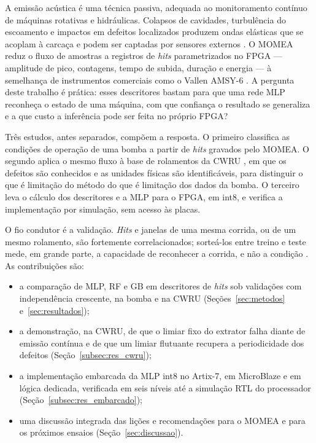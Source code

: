 \documentclass[12pt]{article}
\begin{document}
A emissão acústica é uma técnica passiva, adequada ao monitoramento contínuo de máquinas rotativas e hidráulicas. Colapsos de cavidades, turbulência do escoamento e impactos em defeitos localizados produzem ondas elásticas que se acoplam à carcaça e podem ser captadas por sensores externos \cite{brennen1995,neill1997,mba2006}. O MOMEA reduz o fluxo de amostras a registros de \textit{hits} parametrizados no FPGA --- amplitude de pico, contagens, tempo de subida, duração e energia --- à semelhança de instrumentos comerciais como o Vallen AMSY-6 \cite{unnthorsson2013,vallen2022}. A pergunta deste trabalho é prática: esses descritores bastam para que uma rede MLP reconheça o estado de uma máquina, com que confiança o resultado se generaliza e a que custo a inferência pode ser feita no próprio FPGA?

Três estudos, antes separados, compõem a resposta. O primeiro classifica as condições de operação de uma bomba a partir de \textit{hits} gravados pelo MOMEA. O segundo aplica o mesmo fluxo à base de rolamentos da CWRU \cite{cwru}, em que os defeitos são conhecidos e as unidades físicas são identificáveis, para distinguir o que é limitação do método do que é limitação dos dados da bomba. O terceiro leva o cálculo dos descritores e a MLP para o FPGA, em int8, e verifica a implementação por simulação, sem acesso às placas.

O fio condutor é a validação. \textit{Hits} e janelas de uma mesma corrida, ou de um mesmo rolamento, são fortemente correlacionados; sorteá-los entre treino e teste mede, em grande parte, a capacidade de reconhecer a corrida, e não a condição \cite{kaufman2012,roberts2017}. As contribuições são:
\begin{itemize}
	\item a comparação de MLP, RF e GB em descritores de \textit{hits} sob validações com independência crescente, na bomba e na CWRU (Seções~\ref{sec:metodos} e~\ref{sec:resultados});
	\item a demonstração, na CWRU, de que o limiar fixo do extrator falha diante de emissão contínua e de que um limiar flutuante recupera a periodicidade dos defeitos (Seção~\ref{subsec:res_cwru});
	\item a implementação embarcada da MLP int8 no Artix-7, em MicroBlaze e em lógica dedicada, verificada em seis níveis até a simulação RTL do processador (Seção~\ref{subsec:res_embarcado});
	\item uma discussão integrada das lições e recomendações para o MOMEA e para os próximos ensaios (Seção~\ref{sec:discussao}).
\end{itemize}
\end{document}
